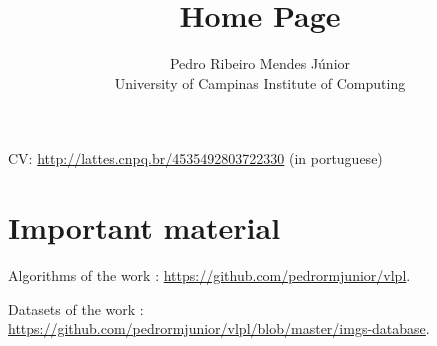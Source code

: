 \documentclass{article}
\title{Home Page}
\author{Pedro Ribeiro Mendes J\'{u}nior\\University of Campinas \textemdash{} Institute of Computing}
\begin{document}
\maketitle

CV: \url{http://lattes.cnpq.br/4535492803722330} (in portuguese)

\section{Important material}
\label{sec:important-material}

Algorithms of the work \cite{MendesJr2011}: \url{https://github.com/pedrormjunior/vlpl}.

Datasets of the work \cite{MendesJr2011}: \url{https://github.com/pedrormjunior/vlpl/blob/master/imgs-database}.



\end{document}
